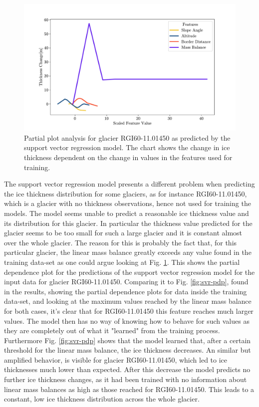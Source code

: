 \begin{figure}[!tp]
	\centering		  
	\includegraphics[width=1.\textwidth]{figures/SVR_low_thick_pdp.pdf}
	\caption{Partial plot analysis for glacier RGI60-11.01450 as predicted by the support vector regression model. The chart shows the change in ice thickness dependent on the change in values in the features used for training.}
	\label{fig:svr-pdp-low-thick}
\end{figure}

The support vector regression model presents a different problem when predicting the ice thickness distribution for some glaciers, as for instance RGI60-11.01450, which is a glacier with no thickness observations, hence not used for training the models. The model seems unable to predict a reasonable ice thickness value and its distribution for this glacier. In particular the thickness value predicted for the glacier seems to be too small for such a large glacier and it is constant almost over the whole glacier. The reason for this is probably the fact that, for this particular glacier, the linear mass balance greatly exceeds any value found in the training data-set as one could argue looking at Fig. \ref{fig:svr-pdp-low-thick}. This shows the partial dependence plot for the predictions of the support vector regression model for the input data for glacier RGI60-11.01450. Comparing it to Fig. \ref{fig:svr-pdp}, found in the results, showing the partial dependence plots for data inside the training data-set, and looking at the maximum values reached by  the linear mass balance for both cases, it's clear that for RGI60-11.01450 this feature reaches much larger values. The model then has no way of knowing how to behave for such values as they are completely out of what it "learned" from the training process. Furthermore Fig. \ref{fig:svr-pdp} shows that the model learned that, after a certain threshold for the linear mass balance, the ice thickness decreases. An similar but amplified behavior, is visible for glacier RGI60-11.01450, which led to ice thicknesses much lower than expected. After this decrease the model predicts no further ice thickness changes, as it had been trained with no information about linear mass balances as high as those reached for RGI60-11.01450. This leads to a constant, low ice thickness distribution across the whole glacier.

